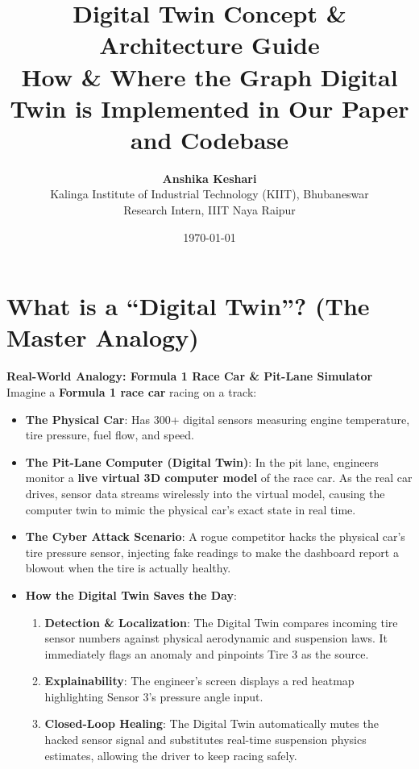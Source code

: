 \documentclass[11pt,a4paper]{article}
\title{\textbf{Digital Twin Concept \& Architecture Guide}\\ \large How \& Where the Graph Digital Twin is Implemented in Our Paper and Codebase}
\author{\textbf{Anshika Keshari} \\ Kalinga Institute of Industrial Technology (KIIT), Bhubaneswar \\ Research Intern, IIIT Naya Raipur}
\date{\today}
\begin{document}
\maketitle

\tableofcontents
\newpage

\section{What is a ``Digital Twin''? (The Master Analogy)}

\begin{mdframed}[style=analogystyle]
\textbf{Real-World Analogy: Formula 1 Race Car \& Pit-Lane Simulator}\\
Imagine a \textbf{Formula 1 race car} racing on a track:
\begin{itemize}
    \item \textbf{The Physical Car}: Has 300+ digital sensors measuring engine temperature, tire pressure, fuel flow, and speed.
    \item \textbf{The Pit-Lane Computer (Digital Twin)}: In the pit lane, engineers monitor a \textbf{live virtual 3D computer model} of the race car. As the real car drives, sensor data streams wirelessly into the virtual model, causing the computer twin to mimic the physical car's exact state in real time.
    \item \textbf{The Cyber Attack Scenario}: A rogue competitor hacks the physical car's tire pressure sensor, injecting fake readings to make the dashboard report a blowout when the tire is actually healthy.
    \item \textbf{How the Digital Twin Saves the Day}:
    \begin{enumerate}
        \item \textbf{Detection \& Localization}: The Digital Twin compares incoming tire sensor numbers against physical aerodynamic and suspension laws. It immediately flags an anomaly and pinpoints Tire 3 as the source.
        \item \textbf{Explainability}: The engineer's screen displays a red heatmap highlighting Sensor 3's pressure angle input.
        \item \textbf{Closed-Loop Healing}: The Digital Twin automatically mutes the hacked sensor signal and substitutes real-time suspension physics estimates, allowing the driver to keep racing safely.
    \end{enumerate}
\end{itemize}
\end{mdframed}
\end{document}
